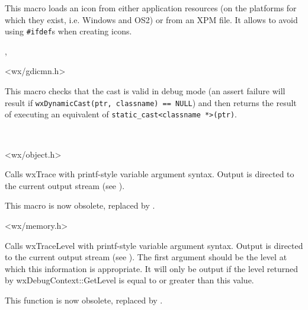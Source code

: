 This macro loads an icon from either application resources (on the platforms
for which they exist, i.e. Windows and OS2) or from an XPM file. It allows to
avoid using {\tt \#ifdef}s when creating icons.


,


<wx/gdicmn.h>

\label{wxstaticcast}


This macro checks that the cast is valid in debug mode (an assert failure will
result if {\tt wxDynamicCast(ptr, classname) == NULL}) and then returns the
result of executing an equivalent of {\tt static\_cast<classname *>(ptr)}.

\\

\label{trace}


<wx/object.h>


Calls wxTrace with printf-style variable argument syntax. Output
is directed to the current output stream (see ).

This macro is now obsolete, replaced by .


<wx/memory.h>

\label{tracelevel}


Calls wxTraceLevel with printf-style variable argument syntax. Output
is directed to the current output stream (see ).
The first argument should be the level at which this information is appropriate.
It will only be output if the level returned by wxDebugContext::GetLevel is equal to or greater than
this value.

This function is now obsolete, replaced by .


